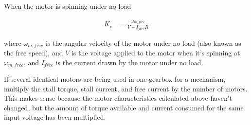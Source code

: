 When the motor is spinning under no load

\begin{align}
  K_v &= \frac{\omega_{m,free}}{V - I_{free}R}
\end{align}

where $\omega_{m,free}$ is the angular velocity of the motor under no load (also
known as the free speed), and $V$ is the voltage applied to the motor when it's
spinning at $\omega_{m,free}$, and $I_{free}$ is the current drawn by the motor
under no load.

If several identical motors are being used in one gearbox for a mechanism,
multiply the stall torque, stall current, and free current by the number of
motors. This makes sense because the motor characteristics calculated above
haven't changed, but the amount of torque available and current consumed for the
same input voltage has been multiplied.
